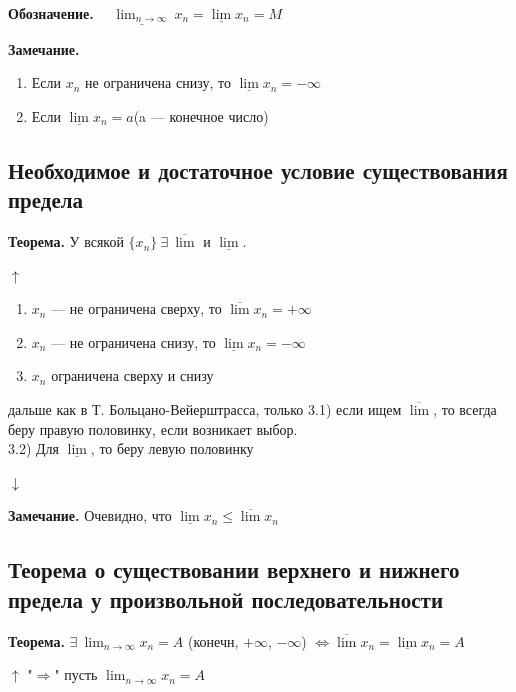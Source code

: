 \documentclass{article}
\begin{document}
    \textbf{Обозначение.} \(\quad \underline{\lim_{n \rightarrow \infty}}\ x_n = \underline{\lim} x_n = M \)

    \textbf{Замечание.} 
    \begin{enumerate}
        \item Если \(x_n\) не ограничена снизу, то \(\underline{\lim}x_n = -\infty\)
        
        \item Если \(\underline{\lim}x_n = a\)(a --- конечное число)
    \end{enumerate}
	
    \subsection{Необходимое и достаточное условие существования предела}
    
    \textbf{Теорема.} У всякой \(\{x_n\}\ \exists\ \overline{\lim}\) и \(\underline{\lim}\).

    \(\uparrow\)
    \begin{enumerate}
        \item \(x_n\) --- не ограничена сверху, то \(\overline{\lim}x_n = +\infty\)
        \item \(x_n\) --- не ограничена снизу, то \(\underline{\lim}x_n = -\infty\)
        \item \(x_n\) ограничена сверху и снизу
    \end{enumerate}

    дальше как в Т. Больцано-Вейерштрасса, только 3.1) если ищем \( \overline{\lim} \), то всегда беру правую половинку, если возникает выбор.
    \\ 3.2) Для \(\underline{\lim}\), то беру левую половинку

    \( \downarrow \)

    \textbf{Замечание.} Очевидно, что \( \underline{\lim}x_n \leq \overline{\lim}x_n\)
    
    \subsection{Теорема о существовании верхнего и нижнего предела у произвольной последовательности}
    
    \textbf{Теорема.} \( \exists\ \lim_{n \rightarrow \infty} x_n = A \) (конечн, \(+\infty\), \(-\infty\)) \( \Leftrightarrow \overline{\lim}x_n = \underline{\lim}x_n = A \)

    \(\uparrow\)
    "\(\Rightarrow\)" пусть \(\lim_{n \rightarrow \infty}{x_n} = A\)
\end{document}
